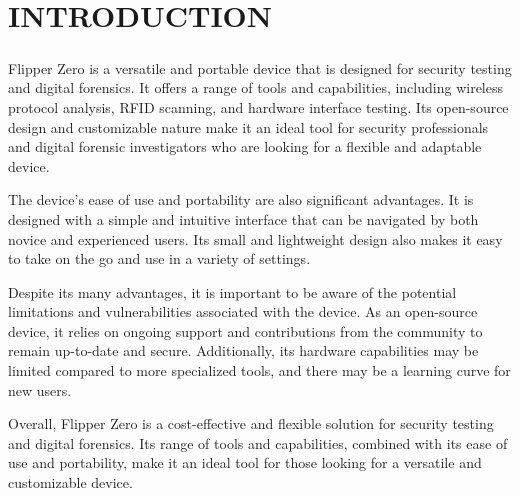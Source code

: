 \documentclass[a4paper,11pt]{report}
\begin{document}
\chapter{INTRODUCTION}

\paragraph{}Flipper Zero is a versatile and portable device that is designed for security testing and digital forensics. It offers a range of tools and capabilities, including wireless protocol analysis, RFID scanning, and hardware interface testing. Its open-source design and customizable nature make it an ideal tool for security professionals and digital forensic investigators who are looking for a flexible and adaptable device.

The device's ease of use and portability are also significant advantages. It is designed with a simple and intuitive interface that can be navigated by both novice and experienced users. Its small and lightweight design also makes it easy to take on the go and use in a variety of settings.

Despite its many advantages, it is important to be aware of the potential limitations and vulnerabilities associated with the device. As an open-source device, it relies on ongoing support and contributions from the community to remain up-to-date and secure. Additionally, its hardware capabilities may be limited compared to more specialized tools, and there may be a learning curve for new users.

Overall, Flipper Zero is a cost-effective and flexible solution for security testing and digital forensics. Its range of tools and capabilities, combined with its ease of use and portability, make it an ideal tool for those looking for a versatile and customizable device.
  
\end{document}
